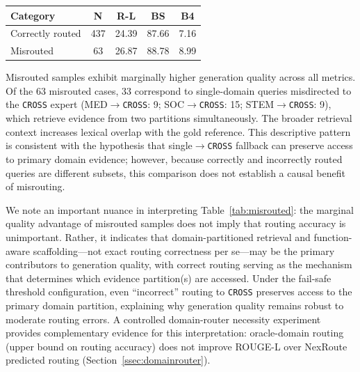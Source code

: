 \documentclass[a4paper,fleql,doubleblind]{cas-sc}
\begin{document}
\vspace{6pt plus 4pt minus 3pt}
\begin{center}
\begingroup
{}
\label{tab:misrouted}
\begin{tabular}{lcccc}
\toprule
\textbf{Category} & \textbf{N} & \textbf{R-L} & \textbf{BS} & \textbf{B4} \\
\midrule
Correctly routed & 437 & 24.39 & 87.66 & 7.16 \\
Misrouted        &  63 & 26.87 & 88.78 & 8.99 \\
\bottomrule
\end{tabular}
\endgroup
\end{center}
\vspace{6pt plus 4pt minus 3pt}

Misrouted samples exhibit marginally higher generation quality across all
metrics. Of the 63 misrouted cases, 33 correspond to single-domain queries
misdirected to the \texttt{CROSS} expert (MED$\to$\texttt{CROSS}: 9;
SOC$\to$\texttt{CROSS}: 15; STEM$\to$\texttt{CROSS}: 9), which retrieve
evidence from two partitions
simultaneously. The broader retrieval context increases lexical overlap with
the gold reference. This descriptive pattern is consistent with the hypothesis
that single$\to$\texttt{CROSS} fallback can preserve access to primary domain evidence;
however, because correctly and incorrectly routed queries are different subsets,
this comparison does not establish a causal benefit of misrouting.

We note an important nuance in interpreting Table~\ref{tab:misrouted}: the
marginal quality advantage of misrouted samples does not imply that routing
accuracy is unimportant. Rather, it indicates that domain-partitioned retrieval
and function-aware scaffolding---not exact routing correctness per se---may
be the primary contributors to generation quality, with correct routing serving as the
mechanism that determines which evidence partition(s) are accessed. Under the
fail-safe threshold configuration, even ``incorrect'' routing to \texttt{CROSS}
preserves access to the primary domain partition, explaining why generation
quality remains robust to moderate routing errors.
A controlled domain-router necessity experiment provides complementary evidence for this interpretation:
oracle-domain routing (upper bound on routing accuracy) does not improve ROUGE-L
over NexRoute predicted routing (Section~\ref{ssec:domainrouter}).
\end{document}
